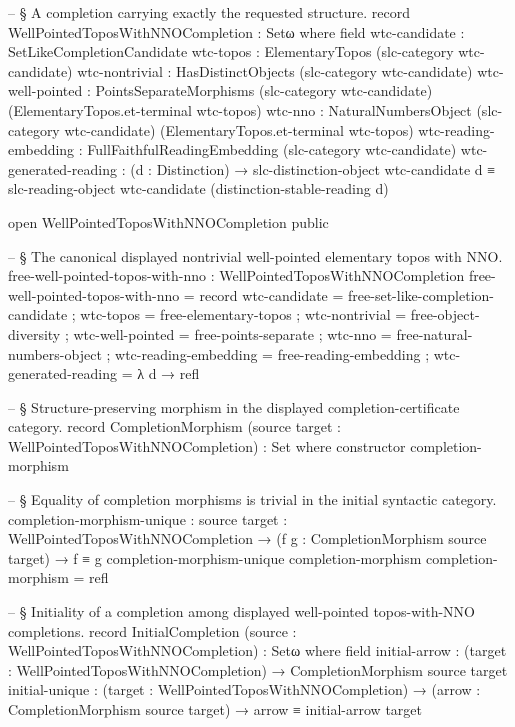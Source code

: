 \documentclass[11pt]{article}
\begin{document}
\begin{code}

-- § A completion carrying exactly the requested structure.
record WellPointedToposWithNNOCompletion : Setω where
  field
    wtc-candidate          : SetLikeCompletionCandidate
    wtc-topos              : ElementaryTopos (slc-category wtc-candidate)
    wtc-nontrivial         : HasDistinctObjects (slc-category wtc-candidate)
    wtc-well-pointed       :
      PointsSeparateMorphisms
        (slc-category wtc-candidate)
        (ElementaryTopos.et-terminal wtc-topos)
    wtc-nno                :
      NaturalNumbersObject
        (slc-category wtc-candidate)
        (ElementaryTopos.et-terminal wtc-topos)
    wtc-reading-embedding  : FullFaithfulReadingEmbedding (slc-category wtc-candidate)
    wtc-generated-reading  : (d : Distinction) →
      slc-distinction-object wtc-candidate d ≡
      slc-reading-object wtc-candidate (distinction-stable-reading d)

open WellPointedToposWithNNOCompletion public

-- § The canonical displayed nontrivial well-pointed elementary topos with NNO.
free-well-pointed-topos-with-nno : WellPointedToposWithNNOCompletion
free-well-pointed-topos-with-nno = record
  { wtc-candidate         = free-set-like-completion-candidate
  ; wtc-topos             = free-elementary-topos
  ; wtc-nontrivial        = free-object-diversity
  ; wtc-well-pointed      = free-points-separate
  ; wtc-nno               = free-natural-numbers-object
  ; wtc-reading-embedding = free-reading-embedding
  ; wtc-generated-reading = λ d → refl
  }

-- § Structure-preserving morphism in the displayed completion-certificate category.
record CompletionMorphism
  (source target : WellPointedToposWithNNOCompletion) : Set where
  constructor completion-morphism

-- § Equality of completion morphisms is trivial in the initial syntactic category.
completion-morphism-unique :
  {source target : WellPointedToposWithNNOCompletion} →
  (f g : CompletionMorphism source target) →
  f ≡ g
completion-morphism-unique completion-morphism completion-morphism = refl

-- § Initiality of a completion among displayed well-pointed topos-with-NNO completions.
record InitialCompletion
  (source : WellPointedToposWithNNOCompletion) : Setω where
  field
    initial-arrow :
      (target : WellPointedToposWithNNOCompletion) →
      CompletionMorphism source target
    initial-unique :
      (target : WellPointedToposWithNNOCompletion) →
      (arrow : CompletionMorphism source target) →
      arrow ≡ initial-arrow target


\end{code}
\end{document}

